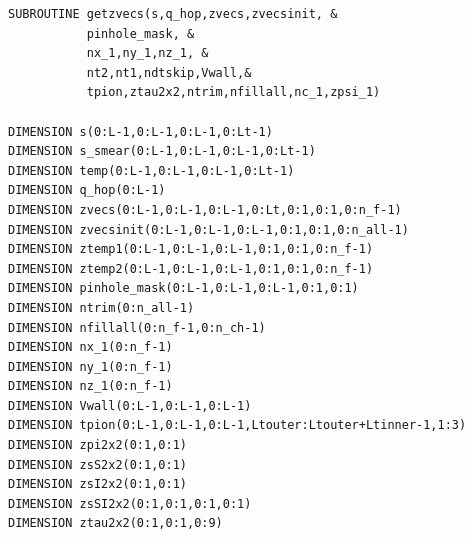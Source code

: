 \documentclass[10pt]{book}
\begin{document}
\begin{lstlisting}[frame=single]
SUBROUTINE getzvecs(s,q_hop,zvecs,zvecsinit, &
           pinhole_mask, &
           nx_1,ny_1,nz_1, &
           nt2,nt1,ndtskip,Vwall,&
           tpion,ztau2x2,ntrim,nfillall,nc_1,zpsi_1)

DIMENSION s(0:L-1,0:L-1,0:L-1,0:Lt-1)
DIMENSION s_smear(0:L-1,0:L-1,0:L-1,0:Lt-1)
DIMENSION temp(0:L-1,0:L-1,0:L-1,0:Lt-1)
DIMENSION q_hop(0:L-1)
DIMENSION zvecs(0:L-1,0:L-1,0:L-1,0:Lt,0:1,0:1,0:n_f-1)
DIMENSION zvecsinit(0:L-1,0:L-1,0:L-1,0:1,0:1,0:n_all-1)
DIMENSION ztemp1(0:L-1,0:L-1,0:L-1,0:1,0:1,0:n_f-1)
DIMENSION ztemp2(0:L-1,0:L-1,0:L-1,0:1,0:1,0:n_f-1)
DIMENSION pinhole_mask(0:L-1,0:L-1,0:L-1,0:1,0:1)
DIMENSION ntrim(0:n_all-1)
DIMENSION nfillall(0:n_f-1,0:n_ch-1)
DIMENSION nx_1(0:n_f-1)
DIMENSION ny_1(0:n_f-1)
DIMENSION nz_1(0:n_f-1)
DIMENSION Vwall(0:L-1,0:L-1,0:L-1)
DIMENSION tpion(0:L-1,0:L-1,0:L-1,Ltouter:Ltouter+Ltinner-1,1:3)
DIMENSION zpi2x2(0:1,0:1)
DIMENSION zsS2x2(0:1,0:1)
DIMENSION zsI2x2(0:1,0:1)
DIMENSION zsSI2x2(0:1,0:1,0:1,0:1)
DIMENSION ztau2x2(0:1,0:1,0:9)
\end{lstlisting} 
\end{document}
